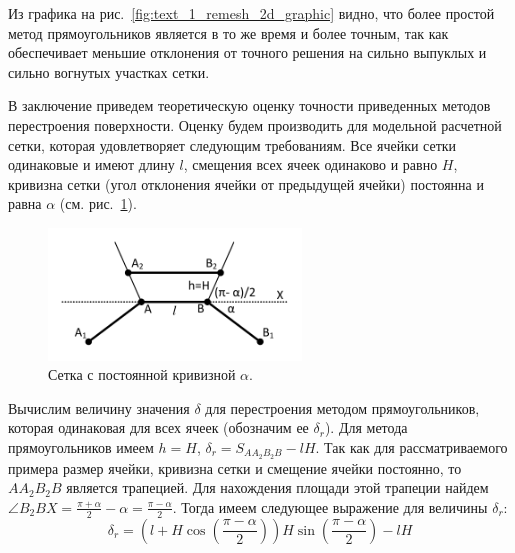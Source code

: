 Из графика на рис.~\ref{fig:text_1_remesh_2d_graphic} видно, что более простой метод прямоугольников является в то же время и более точным, так как обеспечивает меньшие отклонения от точного решения на сильно выпуклых и сильно вогнутых участках сетки.

В заключение приведем теоретическую оценку точности приведенных методов перестроения поверхности.
Оценку будем производить для модельной расчетной сетки, которая удовлетворяет следующим требованиям.
Все ячейки сетки одинаковые и имеют длину $l$, смещения всех ячеек одинаково и равно $H$, кривизна сетки (угол отклонения ячейки от предыдущей ячейки) постоянна и равна $\alpha$ (см. рис.~\ref{fig:text_1_remesh_2d_theoretical_rectangles}).

\begin{figure}[h]
\onelinecaptionstrue
\centering
\includegraphics[width=0.6\textwidth]{pics/text_1_remesh_2d/theoretical_rectangles.pdf}
\caption{Сетка с постоянной кривизной $\alpha$.}
\label{fig:text_1_remesh_2d_theoretical_rectangles}
\end{figure}

Вычислим величину значения $\delta$ для перестроения методом прямоугольников, которая одинаковая для всех ячеек (обозначим ее $\delta_r$).
Для метода прямоугольников имеем $h = H$, $\delta_r = S_{AA_2B_2B} - lH$.
Так как для рассматриваемого примера размер ячейки, кривизна сетки и смещение ячейки постоянно, то $AA_2B_2B$ является трапецией.
Для нахождения площади этой трапеции найдем $\angle B_2BX = \frac{\pi + \alpha}{2} - \alpha = \frac{\pi - \alpha}{2}$.
Тогда имеем следующее выражение для величины $\delta_r$:
\begin{equation}
	\delta_r = \left( l + H \cos \left( \frac{\pi - \alpha}{2} \right) \right) H \sin \left( \frac{\pi - \alpha}{2} \right) - lH
\end{equation}


